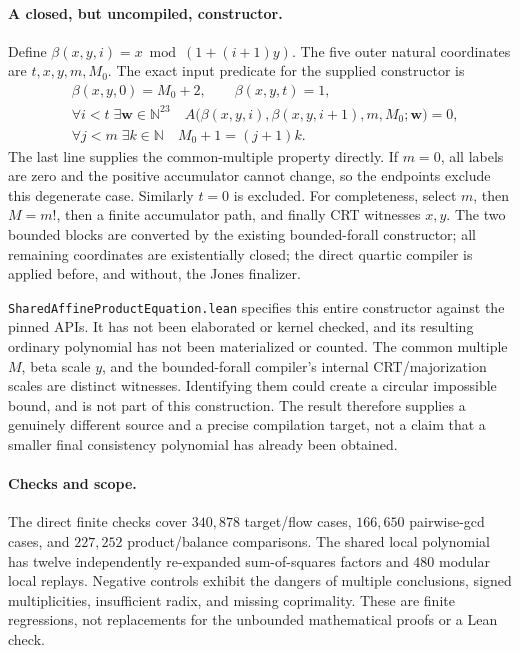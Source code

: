 \paragraph{A closed, but uncompiled, constructor.}
Define $\beta(x,y,i)=x\bmod(1+(i+1)y)$. The five outer natural coordinates
are $t,x,y,m,M_0$. The exact input predicate for the supplied constructor is
\begin{align*}
 &\beta(x,y,0)=M_0+2,\qquad \beta(x,y,t)=1,\\
 &\forall i<t\;\exists\boldsymbol w\in\mathbb N^{23}\quad
 A\bigl(\beta(x,y,i),\beta(x,y,i+1),m,M_0;\boldsymbol w\bigr)=0,\\
 &\forall j<m\;\exists k\in\mathbb N\quad M_0+1=(j+1)k.
\end{align*}
The last line supplies the common-multiple property directly. If $m=0$,
all labels are zero and the positive accumulator cannot change, so the
endpoints exclude this degenerate case. Similarly $t=0$ is excluded.
For completeness, select $m$, then $M=m!$, then a finite accumulator path,
and finally CRT witnesses $x,y$. The two bounded blocks are converted
by the existing bounded-forall constructor; all remaining coordinates are
existentially closed; the direct quartic compiler is applied before, and
without, the Jones finalizer.

\texttt{SharedAffineProductEquation.lean} specifies this entire constructor
against the pinned APIs. It has not been elaborated or kernel checked,
and its resulting ordinary polynomial has not been materialized or
counted. The common multiple $M$, beta scale $y$, and the bounded-forall
compiler's internal CRT/majorization scales are distinct witnesses.
Identifying them could create a circular impossible bound, and is not
part of this construction. The result therefore supplies a genuinely
different source and a precise compilation target, not a claim that a
smaller final consistency polynomial has already been obtained.

\paragraph{Checks and scope.}
The direct finite checks cover $340{,}878$ target/flow cases,
$166{,}650$ pairwise-gcd cases, and $227{,}252$ product/balance comparisons.
The shared local polynomial has twelve independently re-expanded
sum-of-squares factors and $480$ modular local replays. Negative controls
exhibit the dangers of multiple conclusions, signed multiplicities,
insufficient radix, and missing coprimality. These are finite regressions,
not replacements for the unbounded mathematical proofs or a Lean check.
